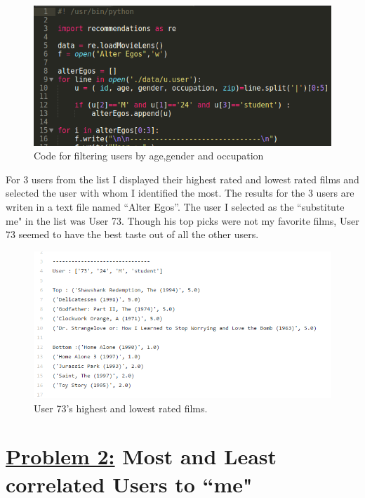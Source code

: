 \documentclass{article}
\begin{document}
\begin{figure}[H]
 \centering
 	\includegraphics[height=6 cm]{p1.png}
  \caption{Code for filtering users by age,gender and occupation}
\end{figure}

 For 3 users from the list I displayed their highest rated and lowest rated films and selected the user with whom I identified the most. The results for the 3 users are writen in a text file named ``Alter Egos''. The user I selected as the ``substitute me" in the list was User 73. Though his top picks were not my favorite films, User 73 seemed to have the best taste out of all the other users.


\begin{figure}[H]
 \centering
 	\includegraphics[height=8 cm]{alter.png}
  \caption{User 73's highest and lowest rated films.}
\end{figure}



\section*{{\underline{\huge {Problem 2:}}  Most and Least correlated Users to ``me"}}
\end{document}
